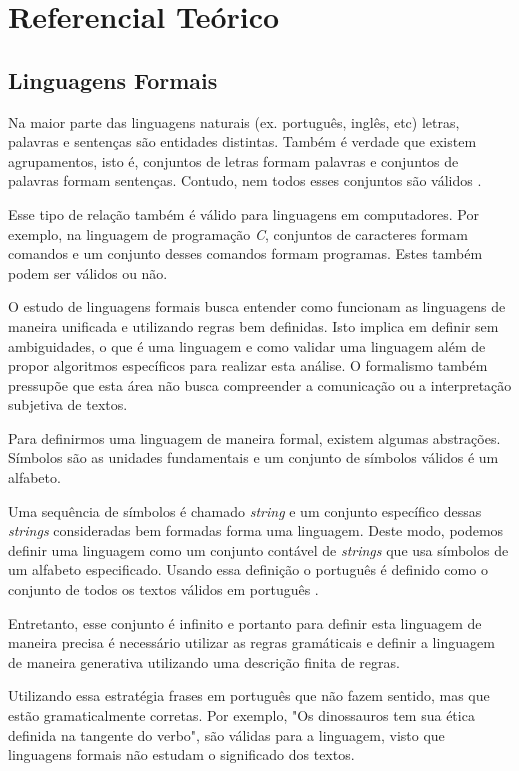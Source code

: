 \chapter[Referencial Teórico]{Referencial Teórico}

\section{Linguagens Formais}
\label{sec:languages}

Na maior parte das linguagens naturais (ex. português, inglês, etc)
letras, palavras e sentenças são entidades distintas.
Também é verdade que existem agrupamentos, isto é, conjuntos de letras
formam palavras e conjuntos de palavras formam sentenças. Contudo, 
nem todos esses conjuntos são válidos \cite{cohen1986}.

Esse tipo de relação também é válido para linguagens em computadores.
Por exemplo, na linguagem de programação \textit{C}, conjuntos de caracteres formam comandos
e um conjunto desses comandos formam programas. Estes também podem ser válidos ou não.

O estudo de linguagens formais busca entender como funcionam as linguagens de maneira unificada 
e utilizando regras bem definidas. Isto implica em definir sem ambiguidades, o que é uma linguagem e
como validar uma linguagem além de propor algoritmos específicos para realizar esta análise. 
O formalismo também pressupõe que esta área não busca compreender a comunicação ou a interpretação 
subjetiva de textos.

Para definirmos uma linguagem de maneira formal, existem algumas abstrações.
Símbolos são as unidades fundamentais e um conjunto de símbolos válidos é um alfabeto.

Uma sequência de símbolos é chamado \textit{string} e um conjunto específico dessas \textit{strings} 
consideradas bem formadas forma uma linguagem. Deste modo, podemos definir uma linguagem 
como um conjunto contável de \textit{strings} que usa símbolos de um alfabeto especificado. 
Usando essa definição o português é definido como o conjunto de todos os textos 
válidos em português \cite{cohen1986}.

Entretanto, esse conjunto é infinito e portanto para definir esta linguagem de maneira precisa
é necessário utilizar as regras gramáticais e definir a linguagem de maneira
generativa utilizando uma descrição finita de regras. 

Utilizando essa estratégia frases em português que não fazem sentido, mas que estão gramaticalmente
corretas. Por exemplo, "Os dinossauros tem sua ética definida na tangente do verbo", são válidas para
a linguagem, visto que linguagens formais não estudam o significado dos textos.

